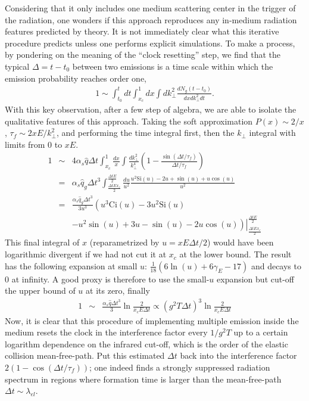 Considering that it only includes one medium scattering center in the trigger of the radiation, one wonders if this approach reproduces any in-medium radiation features predicted by theory.
It is not immediately clear what this iterative procedure predicts unless one performs explicit simulations. 
To make a process, by pondering on the meaning of the ``clock resetting'' step, we find that the typical $\Delta = t-t_0$ between two emissions is a time scale within which the emission probability reaches order one,
\begin{eqnarray}
1 \sim \int_{t_0}^{t} dt\int_{x_c}^1 dx \int dk_\perp^2 \frac{dN_g(t-t_0)}{dx dk_\perp^2 dt}.
\end{eqnarray}
With this key observation, after a few step of algebra, we are able to isolate the qualitative features of this approach.
Taking the soft approximation $P(x) \sim 2/x$, $\tau_f\sim 2xE/k_\perp^2$, and performing the time integral first, then the $k_\perp$ integral with limits from $0$ to $xE$.
\begin{eqnarray}
1 &\sim& 4\alpha_s\hat{q}\Delta t \int_{x_c}^1 \frac{dx}{x} \int \frac{dk_\perp^2}{k_\perp^4}\left(1-\frac{\sin(\Delta t/\tau_f)}{\Delta t/\tau_f}\right)\\
&=& \alpha_s\hat{q}_g \Delta t^3 \int_{\frac{\Delta t E x_c}{2}}^{\frac{\Delta t E}{2}} 
\frac{du}{u^2} \frac{u^2 \mathrm{Si}(u) -2u + \sin(u) + u\cos(u)}{u^2}\\
&=& \frac{\alpha_s\hat{q}_g \Delta t^3}{3u^3} \left(
u^3\mathrm{Ci}(u)-3u^2\mathrm{Si}(u) \right.\\\nonumber
&&\left.\left.- u^2 \sin(u) +3u-\sin(u) - 2u\cos(u)\right)\right|_{\frac{\Delta t E x_c}{2}}^{\frac{\Delta t E}{2}} 
\end{eqnarray}
This final integral of $x$ (reparametrized by $u = xE\Delta t/2$) would have been logarithmic divergent if we had not cut it at $x_c$ at the lower bound.
The result has the following expansion at small $u$: $\frac{1}{18}(6\ln(u)+6\gamma_E - 17)$ and decays to $0$ at infinity. 
A good proxy is therefore to use the small-$u$ expansion but cut-off the upper bound of $u$ at its zero, finally
\begin{eqnarray}
1 &\sim&  \frac{\alpha_s\hat{q}\Delta t^3}{3}\ln\frac{2}{ x_c E \Delta t } \propto (g^2 T \Delta t)^3 \ln\frac{2}{ x_c E \Delta t }
\end{eqnarray}
Now, it is clear that this procedure of implementing multiple emission inside the medium resets the clock in the interference factor every $1/g^2T$ up to a certain logarithm dependence on the infrared cut-off, which is the order of the elastic collision mean-free-path.
Put this estimated $\Delta t$ back into the interference factor $2(1-\cos(\Delta t/\tau_f))$; one indeed finds a strongly suppressed radiation spectrum in regions where formation time is larger than the mean-free-path $\Delta t\sim \lambda_{el}$.

